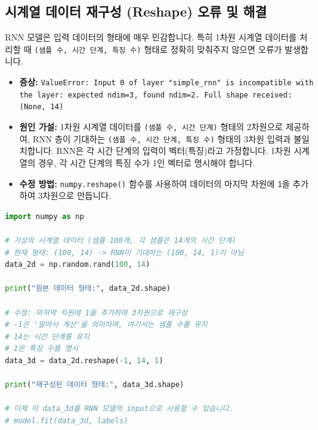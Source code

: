 \documentclass[11pt,a4paper]{book}
\theoremstyle{definition}
\begin{document}
\subsection{시계열 데이터 재구성 (Reshape) 오류 및 해결}
RNN 모델은 입력 데이터의 형태에 매우 민감합니다. 특히 1차원 시계열 데이터를 처리할 때 \texttt{(샘플 수, 시간 단계, 특징 수)} 형태로 정확히 맞춰주지 않으면 오류가 발생합니다.

\begin{itemize}
    \item \textbf{증상:} \texttt{ValueError: Input 0 of layer "simple\_rnn" is incompatible with the layer: expected ndim=3, found ndim=2. Full shape received: (None, 14)}
    \item \textbf{원인 가설:} 1차원 시계열 데이터를 \texttt{(샘플 수, 시간 단계)} 형태의 2차원으로 제공하여, RNN 층이 기대하는 \texttt{(샘플 수, 시간 단계, 특징 수)} 형태의 3차원 입력과 불일치합니다. RNN은 각 시간 단계의 입력이 벡터(특징)라고 가정합니다. 1차원 시계열의 경우, 각 시간 단계의 특징 수가 1인 벡터로 명시해야 합니다.
    \item \textbf{수정 방법:} \texttt{numpy.reshape()} 함수를 사용하여 데이터의 마지막 차원에 \texttt{1}을 추가하여 3차원으로 만듭니다.
\end{itemize}

\begin{lstlisting}[language=Python, caption=시계열 데이터 재구성 예시, label=lst:reshape_fix]
import numpy as np

# 가상의 시계열 데이터 (샘플 100개, 각 샘플은 14개의 시간 단계)
# 현재 형태: (100, 14) -> RNN이 기대하는 (100, 14, 1)이 아님
data_2d = np.random.rand(100, 14) 

print("원본 데이터 형태:", data_2d.shape)

# 수정: 마지막 차원에 1을 추가하여 3차원으로 재구성
# -1은 '알아서 계산'을 의미하며, 여기서는 샘플 수를 유지
# 14는 시간 단계를 유지
# 1은 특징 수를 명시
data_3d = data_2d.reshape(-1, 14, 1) 

print("재구성된 데이터 형태:", data_3d.shape)

# 이제 이 data_3d를 RNN 모델의 input으로 사용할 수 있습니다.
# model.fit(data_3d, labels)
\end{lstlisting}
\end{document}
